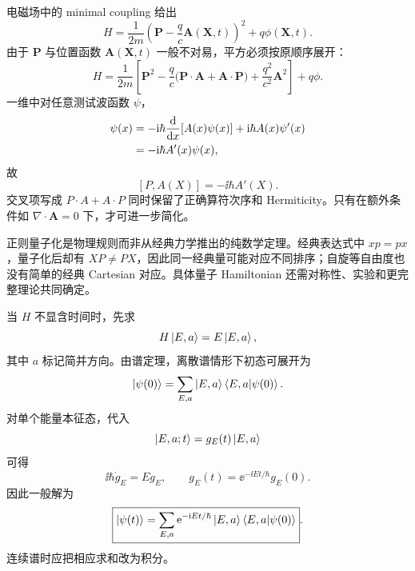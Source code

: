 电磁场中的 minimal coupling 给出
\begin{equation}
  H=\frac1{2m}\left(\bm P-\frac qc\bm A(\bm X,t)\right)^2
    +q\phi(\bm X,t).
  \label{eq:QM-C04-S03-em-hamiltonian-compact}
\end{equation}
由于 $\bm P$ 与位置函数 $\bm A(\bm X,t)$ 一般不对易，平方必须按原顺序展开：
\begin{equation}
  H=\frac1{2m}\left[
    \bm P^2-\frac qc\bigl(\bm P\mathbin{\cdot}\bm A
    +\bm A\mathbin{\cdot}\bm P\bigr)
    +\frac{q^2}{c^2}\bm A^2\right]+q\phi.
  \label{eq:QM-C04-S03-em-hamiltonian-expanded}
\end{equation}
一维中对任意测试波函数 $\psi$，
\begin{align}
  [P,A(X)]\psi(x)
  &=-\ii\hbar\frac{\dd}{\dd x}[A(x)\psi(x)]
    +\ii\hbar A(x)\psi'(x)\notag\\
  &=-\ii\hbar A'(x)\psi(x),
  \label{eq:QM-C04-S03-commutator-derivation}
\end{align}
故
\begin{equation}
  \boxed{[P,A(X)]=-\ii\hbar A'(X)}.
  \label{eq:QM-C04-S03-commutator-function}
\end{equation}
交叉项写成 $P\cdot A+A\cdot P$ 同时保留了正确算符次序和 Hermiticity。只有在额外条件如 $\nabla\cdot\bm A=0$ 下，才可进一步简化。

正则量子化是物理规则而非从经典力学推出的纯数学定理。经典表达式中 $xp=px$，量子化后却有 $XP\neq PX$，因此同一经典量可能对应不同排序；自旋等自由度也没有简单的经典 Cartesian 对应。具体量子 Hamiltonian 还需对称性、实验和更完整理论共同确定。



当 $H$ 不显含时间时，先求
\begin{equation}
  H\left|E,a\right\rangle=E\left|E,a\right\rangle,
  \label{eq:QM-C04-S03-energy-eigenproblem}
\end{equation}
其中 $a$ 标记简并方向。由谱定理，离散谱情形下初态可展开为
\begin{equation}
  \left|\psi(0)\right\rangle
  =\sum_{E,a}\left|E,a\right\rangle\left\langle E,a \middle| \psi(0) \right\rangle.
  \label{eq:QM-C04-S03-initial-energy-expansion}
\end{equation}
对单个能量本征态，代入
\begin{equation}
  \left|E,a;t\right\rangle=g_E(t)\left|E,a\right\rangle
  \label{eq:QM-C04-S03-separated-energy-state}
\end{equation}
可得
\begin{equation}
  \ii\hbar\dot g_E=Eg_E,
  \qquad
  g_E(t)=\ee^{-\ii Et/\hbar}g_E(0).
  \label{eq:QM-C04-S03-energy-phase-ode}
\end{equation}
因此一般解为
\begin{equation}
  \boxed{\left|\psi(t)\right\rangle
  =\sum_{E,a}\mathrm{e}^{-\mathrm{i} Et/\hbar}
    \left|E,a\right\rangle\left\langle E,a \middle| \psi(0) \right\rangle}.
  \label{eq:QM-C04-S03-general-energy-solution}
\end{equation}
连续谱时应把相应求和改为积分。

